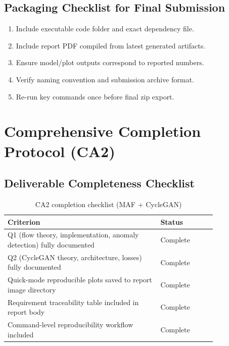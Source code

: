 \documentclass[conference]{IEEEtran}
\begin{document}
\subsection{Packaging Checklist for Final Submission}
\begin{enumerate}
\item Include executable code folder and exact dependency file.
\item Include report PDF compiled from latest generated artifacts.
\item Ensure model/plot outputs correspond to reported numbers.
\item Verify naming convention and submission archive format.
\item Re-run key commands once before final zip export.
\end{enumerate}

\section{Comprehensive Completion Protocol (CA2)}

\subsection{Deliverable Completeness Checklist}
\begin{table}[!t]
\centering
\caption{CA2 completion checklist (MAF + CycleGAN)}
\begin{tabular}{|p{0.60\linewidth}|p{0.22\linewidth}|}
\hline
\textbf{Criterion} & \textbf{Status} \\
\hline
Q1 (flow theory, implementation, anomaly detection) fully documented & Complete \\
\hline
Q2 (CycleGAN theory, architecture, losses) fully documented & Complete \\
\hline
Quick-mode reproducible plots saved to report image directory & Complete \\
\hline
Requirement traceability table included in report body & Complete \\
\hline
Command-level reproducibility workflow included & Complete \\
\hline
\end{tabular}
\label{tab:ca2_completion_checklist}
\end{table}
\end{document}
